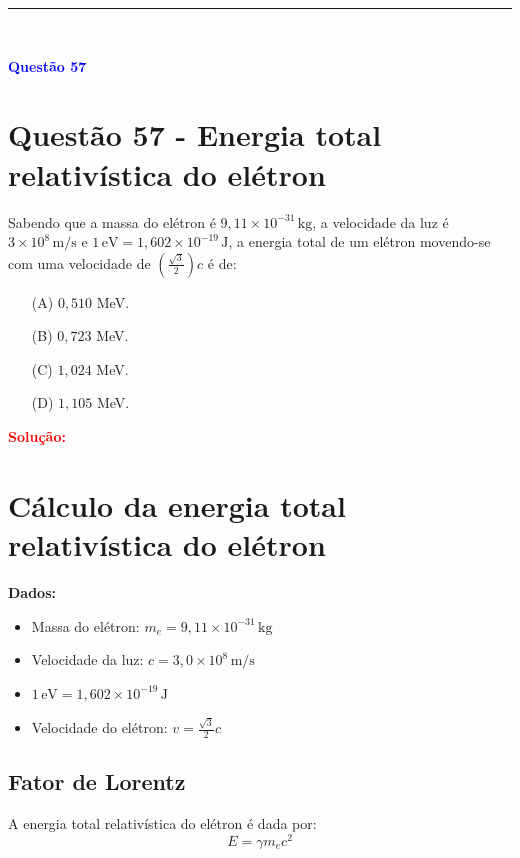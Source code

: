 \documentclass[a4paper,12pt]{article}
\begin{document}
\noindent\rule{\linewidth}{0.6pt}\\

\begin{flushleft}
\textbf{\textcolor{blue}{\Large Quest\~ao 57}}\\
\noindent
\section{Quest\~ao 57 - Energia total relativística do elétron}
Sabendo que a massa do elétron é \( 9,11 \times 10^{-31}\, \mathrm{kg} \), a velocidade da luz é 
\( 3 \times 10^8\, \mathrm{m/s} \) e \( 1\,\mathrm{eV} = 1{,}602 \times 10^{-19}\, \mathrm{J} \), 
a energia total de um elétron movendo-se com uma velocidade de \( \left( \frac{\sqrt{3}}{2} \right) c \) é de:

\begin{itemize}
\item[(A)] $0{,}510$ MeV.
\item[(B)] $0{,}723$ MeV.
\item[(C)] $1{,}024$ MeV.
\item[(D)] $1{,}105$ MeV.
\end{itemize}

\vspace{0.5cm}

\textcolor{red}{\textbf{Solução:}}\\

\section*{Cálculo da energia total relativística do elétron}

\textbf{Dados:}
\begin{itemize}
    \item Massa do elétron: \(m_e = 9{,}11 \times 10^{-31}\, \mathrm{kg}\)
    \item Velocidade da luz: \(c = 3{,}0 \times 10^8\, \mathrm{m/s}\)
    \item \(1\,\mathrm{eV} = 1{,}602 \times 10^{-19}\, \mathrm{J}\)
    \item Velocidade do elétron: \(v = \frac{\sqrt{3}}{2} c\)
\end{itemize}

\subsection*{Fator de Lorentz}

A energia total relativística do elétron é dada por:
\[
E = \gamma m_e c^2
\]


\end{flushleft}
\end{document}
